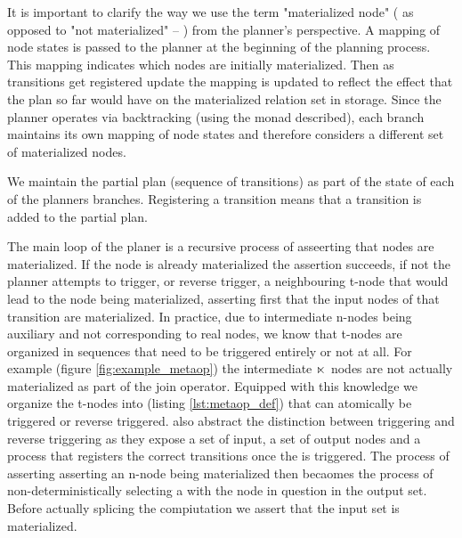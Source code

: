 It is important to clarify the way we use the term "materialized node"
( as opposed to "not materialized" -- ) from the planner's
perspective. A mapping of node states is passed to the planner at the
beginning of the planning process. This mapping indicates which nodes
are initially materialized. Then as transitions get registered update
the mapping is updated to reflect the effect that the plan so far
would have on the materialized relation set in storage. Since the
planner operates via backtracking (using the  monad described),
each branch maintains its own mapping of node states and therefore
considers a different set of materialized nodes.

We maintain the partial plan (sequence of transitions) as part of the
state of each of the planners branches. Registering a transition means
that a transition is added to the partial plan.

The main loop of the planer is a recursive process of asseerting that
nodes are materialized. If the node is already materialized the
assertion succeeds, if not the planner attempts to trigger, or reverse
trigger, a neighbouring t-node that would lead to the node being
materialized, asserting first that the input nodes of that transition
are materialized. In practice, due to intermediate n-nodes being
auxiliary and not corresponding to real nodes, we know that t-nodes
are organized in sequences that need to be triggered entirely or not
at all. For example (figure \ref{fig:example_metaop}) the intermediate
\(\ltimes\) nodes are not actually materialized as part of the join
operator. Equipped with this knowledge we organize the t-nodes into
 (listing \ref{lst:metaop_def}) that can atomically be triggered or
reverse triggered.  also abstract the distinction between
triggering and reverse triggering as they expose a set of input, a set
of output nodes and a process that registers the correct transitions
once the  is triggered. The process of asserting asserting an
n-node being materialized then becaomes the process of
non-deterministically selecting a  with the node in question
in the output set. Before actually splicing the  compiutation
we assert that the input set is materialized.


